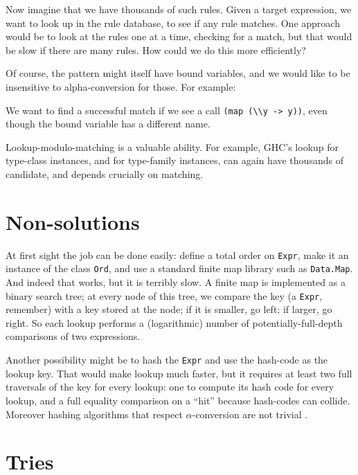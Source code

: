 \documentclass[acmsmall]{acmart}
\theoremstyle{theorem}
\theoremstyle{definition}
\theoremstyle{remark}
\begin{document}
Now imagine that we have thousands of such rules.  Given a target
expression, we want to look up in the rule database, to see if any
rule matches.  One approach would be to look at the rules one at a
time, checking for a match, but that would be slow if there are many rules.
How could we do this more efficiently?

Of course, the pattern might itself have bound variables, and we would
like to be insensitive to alpha-conversion for those. For example:
\begin{code}
{-# RULES "map/id"  map (\\x -> x) = \\x -> x
\end{code}
We want to find a successful match if we see a call \lstinline{(map (\\y -> y))},
even though the bound variable has a different name.

Lookup-modulo-matching is a valuable ability.  For example, GHC's lookup for
type-class instances, and for type-family instances, can again have thousands
of candidate, and depends crucially on matching.

\section{Non-solutions} \label{sec:ord}

At first sight the job can be done easily: define a total order on
\lstinline{Expr}, make it an instance of the class \lstinline{Ord},
and use a standard finite map library such as \lstinline{Data.Map}.
And indeed that works, but it is terribly slow.  A finite map is
implemented as a binary search tree; at every node of this tree, we compare the key (a \lstinline{Expr}, remember) with
a key stored at the node; if it is smaller, go left; if larger, go right. So each lookup
performs a (logarithmic) number of potentially-full-depth comparisons of two expressions.

Another possibility might be to hash the \lstinline{Expr} and use the
hash-code as the lookup key.  That would make lookup much faster, but
it requires at least two full traversals of the key for every lookup:
one to compute its hash code for every lookup, and a full equality
comparison on a ``hit'' because hash-codes can collide.  Moreover
hashing algorithms that respect $\alpha$-conversion are not trivial
\cite{alpha-hashing}.

\section{Tries} \label{sec:ExprS}
\end{document}
